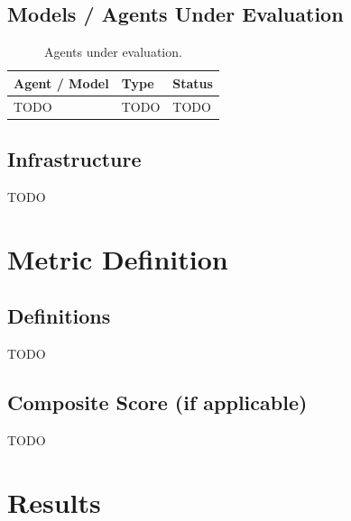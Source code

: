 \documentclass[11pt]{article}
\begin{document}
\subsection{Models / Agents Under Evaluation}


\begin{table}[h]
\centering
\begin{tabular}{@{}lll@{}}
\toprule
Agent / Model & Type & Status \\
\midrule
TODO & TODO & TODO \\
\bottomrule
\end{tabular}
\caption{Agents under evaluation.}
\end{table}

\subsection{Infrastructure}


TODO

\section{Metric Definition}
\label{sec:metric}

\subsection{Definitions}


TODO

\subsection{Composite Score (if applicable)}


TODO

\section{Results}
\label{sec:results}
\end{document}
